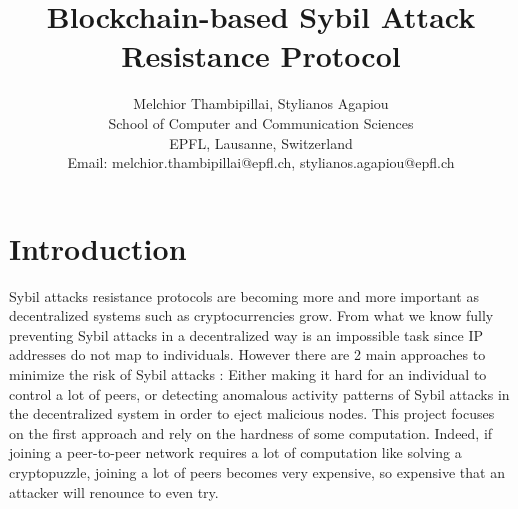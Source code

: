 \documentclass[twocolumn]{article}
\begin{document}
\title{Blockchain-based Sybil Attack Resistance Protocol} 

\author{Melchior Thambipillai, Stylianos Agapiou\\
        School of Computer and Communication Sciences\\
        EPFL, Lausanne, Switzerland\\
    Email: melchior.thambipillai@epfl.ch, stylianos.agapiou@epfl.ch}

\maketitle

\section{Introduction}

Sybil attacks resistance protocols are becoming more and more important as decentralized systems such as cryptocurrencies grow. From what we know fully preventing Sybil attacks in a decentralized way is an impossible task since IP addresses do not map to individuals. However there are 2 main approaches to minimize the risk of Sybil attacks : Either making it hard for an individual to control a lot of peers, or detecting anomalous activity patterns of Sybil attacks in the decentralized system in order to eject malicious nodes. This project focuses on the first approach and rely on the hardness of some computation. Indeed, if joining a peer-to-peer network requires a lot of computation like solving a cryptopuzzle, joining a lot of peers becomes very expensive, so expensive that an attacker will renounce to even try.
\end{document}
